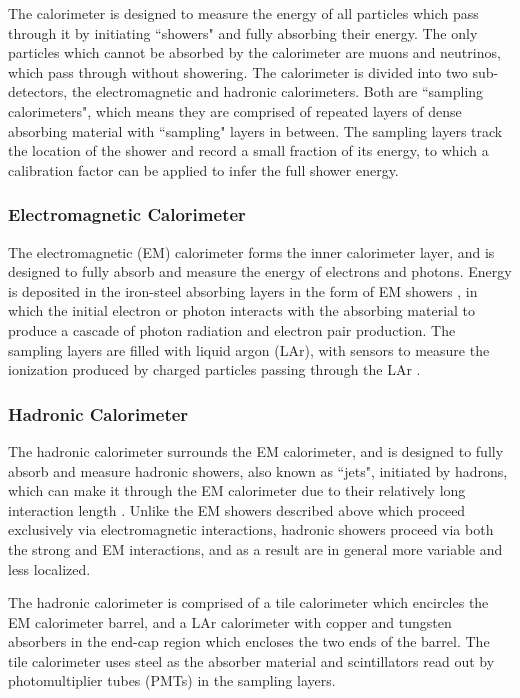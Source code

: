 \documentclass[12pt]{article}
\begin{document}
The calorimeter is designed to measure the energy of all particles which pass through it by initiating ``showers" and fully absorbing their energy. The only particles which cannot be absorbed by the calorimeter are muons and neutrinos, which pass through without showering. The calorimeter is divided into two sub-detectors, the electromagnetic and hadronic calorimeters. Both are ``sampling calorimeters", which means they are comprised of repeated layers of dense absorbing material with ``sampling" layers in between. The sampling layers track the location of the shower and record a small fraction of its energy, to which a calibration factor can be applied to infer the full shower energy. 

\subsubsection{Electromagnetic Calorimeter}

The electromagnetic (EM) calorimeter forms the inner calorimeter layer, and is designed to fully absorb and measure the energy of electrons and photons. Energy is deposited in the iron-steel absorbing layers in the form of EM showers \cite{em_showers}, in which the initial electron or photon interacts with the absorbing material to produce a cascade of photon radiation and electron pair production. The sampling layers are filled with liquid argon (LAr), with sensors to measure the ionization produced by charged particles passing through the LAr \cite{em_cal}. 

\subsubsection{Hadronic Calorimeter}

The hadronic calorimeter surrounds the EM calorimeter, and is designed to fully absorb and measure hadronic showers, also known as ``jets", initiated by hadrons, which can make it through the EM calorimeter due to their relatively long interaction length \cite{atlas}. Unlike the EM showers described above which proceed exclusively via electromagnetic interactions, hadronic showers proceed via both the strong and EM interactions, and as a result are in general more variable and less localized. 

The hadronic calorimeter is comprised of a tile calorimeter which encircles the EM calorimeter barrel, and a LAr calorimeter with copper and tungsten absorbers in the end-cap region which encloses the two ends of the barrel. The tile calorimeter uses steel as the absorber material and scintillators read out by photomultiplier tubes (PMTs) in the sampling layers. 
\end{document}
